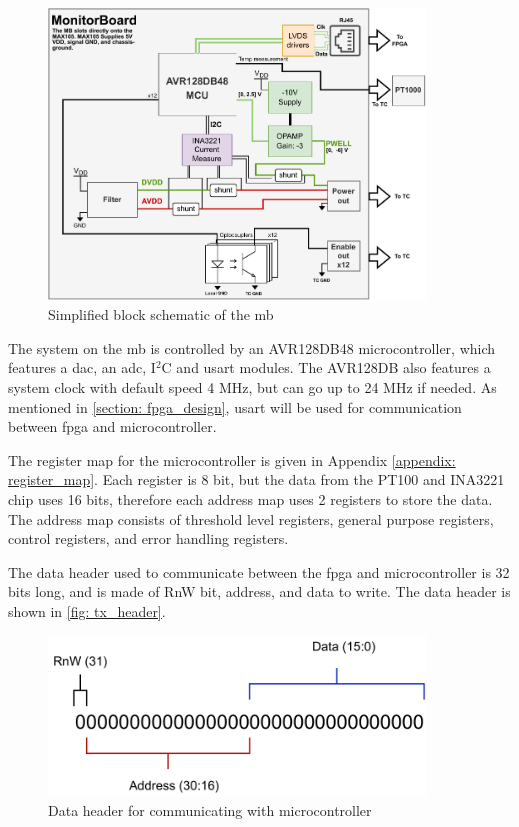\documentclass[main.tex]{subfiles}
\begin{document}
\begin{figure}[!htpb]
    \centering
    \includegraphics[width=10cm, scale=1]{images/MonitorBoardBlockSchematic.pdf}
    \caption{Simplified block schematic of the \acrfull{mb}\cite{birger}}
    \label{fig: mb_schematic}
\end{figure}
\FloatBarrier

The system on the \gls{mb} is controlled by an AVR128DB48 microcontroller, which features a \gls{dac}, an \gls{adc}, I$^2$C and \gls{usart} modules. The AVR128DB also features a  system clock with default speed 4 MHz, but can go up to 24 MHz if needed. As mentioned in \autoref{section: fpga_design}, \acrshort{usart} will be used for communication between \gls{fpga} and microcontroller.

The register map for the microcontroller is given in Appendix \ref{appendix: register_map}. Each register is 8 bit, but the data from the PT100 and INA3221 chip uses 16 bits, therefore each address map uses 2 registers to store the data. The address map consists of threshold level registers, general purpose registers, control registers, and error handling registers.

The data header used to communicate between the \gls{fpga} and microcontroller is 32 bits long, and is made of RnW bit, address, and data to write. The data header is shown in \autoref{fig: tx_header}.

\begin{figure}[!htpb]
    \centering
    \includegraphics[width=10cm, scale=1]{images/TX packet header.pdf}
    \caption{Data header for communicating with microcontroller}
    \label{fig: tx_header}
\end{figure}
\FloatBarrier
\end{document}
